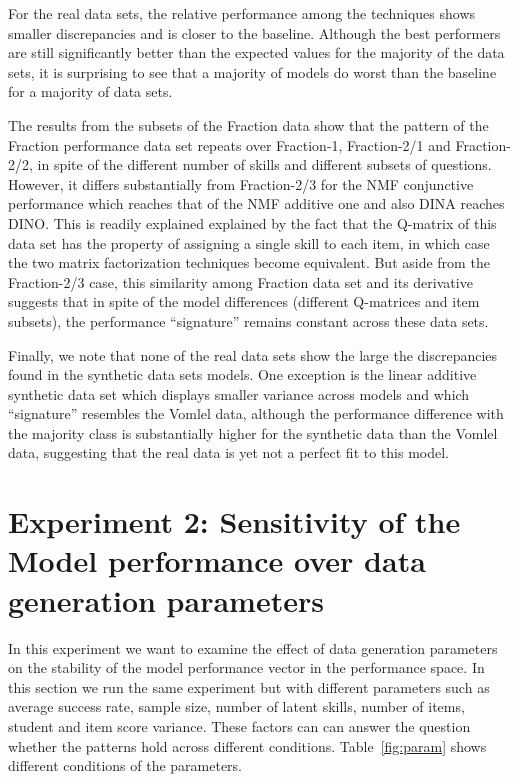 For the real data sets, the relative performance among the techniques shows smaller discrepancies and is closer to the baseline. Although the best performers are still significantly better than the expected values for the majority of the data sets, it is surprising to see that a majority of models do worst than the baseline for a majority of data sets. 

The results from the subsets of the Fraction data show that the pattern of the Fraction performance data set repeats over Fraction-1, Fraction-2/1 and Fraction-2/2, in spite of the different number of skills and different subsets of questions.  However, it differs substantially from Fraction-2/3 for the NMF conjunctive performance which reaches that of the NMF additive one and also DINA reaches DINO. This is readily explained explained by the fact that the Q-matrix of this data set has the property of assigning a single skill to each item, in which case the two matrix factorization techniques become equivalent.  But aside from the Fraction-2/3 case, this similarity among Fraction data set and its derivative suggests that in spite of the model differences (different Q-matrices and item subsets), the performance ``signature'' remains constant across these data sets.

Finally, we note that none of the real data sets show the large the discrepancies found in the synthetic data sets models. One exception is the linear additive synthetic data set which displays smaller variance across models and which ``signature'' resembles the Vomlel data, although the performance difference with the majority class is substantially higher for the synthetic data than the Vomlel data, suggesting that the real data is yet not a perfect fit to this model.



\section{Experiment 2: Sensitivity of the Model performance over data generation parameters}
\label{Sensitive}

In this experiment we want to examine the effect of data generation parameters on the stability of the model performance vector in the performance space. In this section we run the same experiment but with different parameters such as average success rate, sample size, number of latent skills, number of items, student and item score variance. These factors can can answer the question whether the patterns hold across different conditions. Table~\ref{fig:param} shows different conditions of the parameters.

